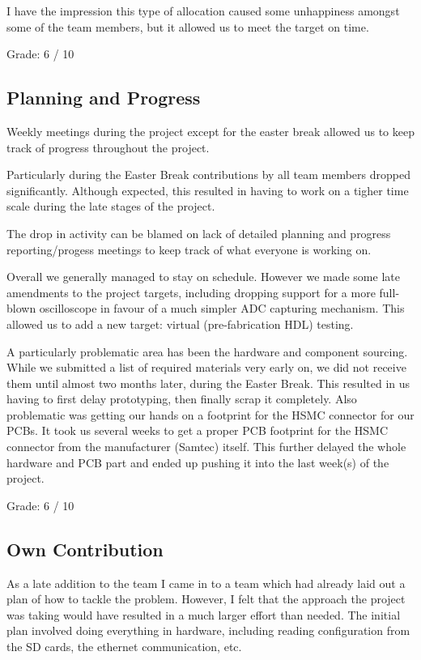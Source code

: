 I have the impression this type of allocation caused some unhappiness amongst
some of the team members, but it allowed us to meet the target on time.

Grade: 6 / 10



\subsection{Planning and Progress}
Weekly meetings during the project except for the easter break allowed us to keep
track of progress throughout the project.

Particularly during the Easter Break contributions by all team members
dropped significantly. Although expected, this resulted in having to work on
a tigher time scale during the late stages of the project.

The drop in activity can be blamed on lack of detailed planning and progress
reporting/progess meetings to keep track of what everyone is working on.

Overall we generally managed to stay on schedule. However we made some late
amendments to the project targets, including dropping support for a more full-blown
oscilloscope in favour of a much simpler ADC capturing mechanism. This allowed
us to add a new target: virtual (pre-fabrication HDL) testing.

A particularly problematic area has been the hardware and component sourcing. While
we submitted a list of required materials very early on, we did not receive them
until almost two months later, during the Easter Break. This resulted in us having
to first delay prototyping, then finally scrap it completely. Also problematic
was getting our hands on a footprint for the HSMC connector for our PCBs. It took
us several weeks to get a proper PCB footprint for the HSMC connector from the manufacturer (Samtec)
itself. This further delayed the whole hardware and PCB part and ended up pushing
it into the last week(s) of the project.

Grade: 6 / 10



\subsection{Own Contribution}
As a late addition to the team I came in to a team which had already laid
out a plan of how to tackle the problem. However, I felt that the approach
the project was taking would have resulted in a much larger effort than needed.
The initial plan involved doing everything in hardware, including reading configuration
from the SD cards, the ethernet communication, etc.

